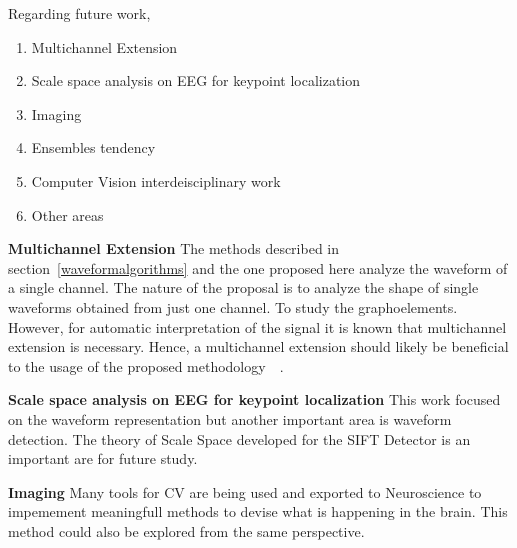 Regarding future work, 

\begin{enumerate}
\item Multichannel Extension
\item Scale space analysis on EEG for keypoint localization
\item Imaging
\item Ensembles tendency
\item Computer Vision interdeisciplinary work
\item Other areas
\end{enumerate}

\textbf{Multichannel Extension}
The methods described in section~\ref{waveformalgorithms} and the one proposed here analyze the waveform of a single channel.
The nature of the proposal is to analyze the shape of single waveforms obtained from just one channel.  To study the graphoelements.
However, for automatic interpretation of the signal it is known that multichannel extension is necessary.  Hence, a multichannel extension should likely be beneficial to the usage of the proposed methodology~~\cite{Gribonval2008}.

\textbf{Scale space analysis on EEG for keypoint localization}
This work focused on the waveform representation but another important area is waveform detection.  The theory of Scale Space developed for the SIFT Detector is an important are for future study.


\textbf{Imaging}
Many tools for CV are being used and exported to Neuroscience to impemement meaningfull methods to devise what is happening in the brain.  This method could also be explored from the same perspective.


